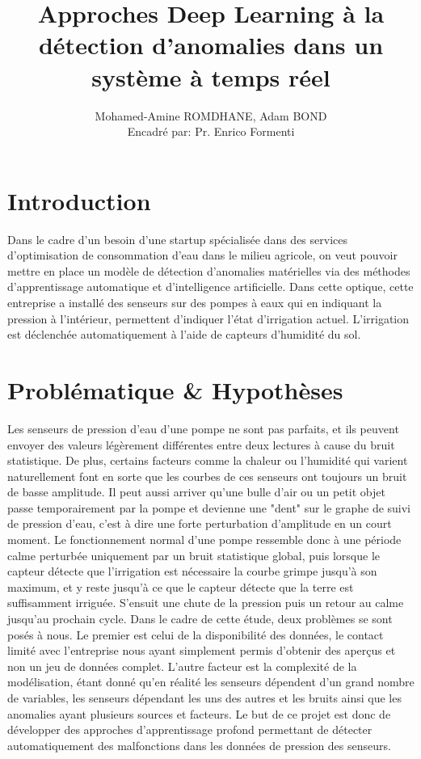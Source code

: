 \documentclass[french]{article}
\title{Approches Deep Learning à la détection d'anomalies dans un système à temps réel}
\author{Mohamed-Amine ROMDHANE, Adam BOND\\Encadré par: Pr. Enrico Formenti}
\date{}
\theoremstyle{mytheoremstyle}
\theoremstyle{mytheoremstyle}
\theoremstyle{myproblemstyle}
\begin{document}
    \maketitle

    \tableofcontents
    \clearpage
    

    \section{Introduction}
    Dans le cadre d'un besoin d'une startup spécialisée dans des services d'optimisation de consommation d'eau dans le milieu agricole, on veut pouvoir mettre en place un modèle de détection d'anomalies matérielles via des méthodes d'apprentissage automatique et d'intelligence artificielle. Dans cette optique, cette entreprise a installé des senseurs sur des pompes à eaux qui en indiquant la pression à l'intérieur, permettent d'indiquer l'état d'irrigation actuel. L'irrigation est déclenchée automatiquement à l'aide de capteurs d'humidité du sol.     
    \section{Problématique \& Hypothèses}
    Les senseurs de pression d'eau d'une pompe ne sont pas parfaits, et ils peuvent envoyer des valeurs légèrement différentes entre deux lectures à cause du bruit statistique. De plus, certains facteurs comme la chaleur ou l'humidité qui varient naturellement font en sorte que les courbes de ces senseurs ont toujours un bruit de basse amplitude. Il peut aussi arriver qu'une bulle d'air ou un petit objet passe temporairement par la pompe et devienne une "dent" sur le graphe de suivi de pression d'eau, c'est à dire une forte perturbation d'amplitude en un court moment.
    \newline
    \indent Le fonctionnement normal d'une pompe ressemble donc à une période calme perturbée uniquement par un bruit statistique global, puis lorsque le capteur détecte que l'irrigation est nécessaire la courbe grimpe jusqu'à son maximum, et y reste jusqu'à ce que le capteur détecte que la terre est suffisamment irriguée. S'ensuit une chute de la pression puis un retour au calme jusqu'au prochain cycle.
    \newline
    \indent Dans le cadre de cette étude, deux problèmes se sont posés à nous. Le premier est celui de la disponibilité des données, le contact limité avec l'entreprise nous ayant simplement permis d'obtenir des aperçus et non un jeu de données complet. L'autre facteur est la complexité de la modélisation, étant donné qu'en réalité les senseurs dépendent d'un grand nombre de variables, les senseurs dépendant les uns des autres et les bruits ainsi que les anomalies ayant plusieurs sources et facteurs. 
    \newline
    \indent Le but de ce projet est donc de développer des approches d'apprentissage profond permettant de détecter automatiquement des malfonctions dans les données de pression des senseurs.
\end{document}
